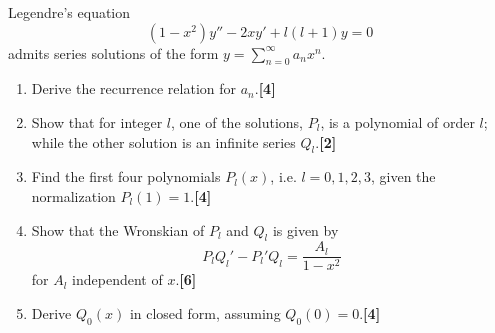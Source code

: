 \documentclass[a4paper]{article}
\begin{document}
\newpage
\begin{qns}
Legendre's equation
$$(1-x^2)y''-2xy'+l(l+1)y=0$$
admits series solutions of the form $y=\sum_{n=0}^\infty a_nx^n$.
\begin{enumerate}[label=(\alph*)]
\item Derive the recurrence relation for $a_n$.\hfill \textbf{[4]}
\item Show that for integer $l$, one of the solutions, $P_l$, is  a polynomial of order $l$; while the other solution is an infinite series $Q_l$.\hfill \textbf{[2]}
\item Find the first four polynomials $P_l(x)$, i.e. $l=0,1,2,3$, given the normalization $P_l(1)=1$.\hfill \textbf{[4]}
\item Show that the Wronskian of $P_l$ and $Q_l$ is given by
$$P_lQ_l'-P_l'Q_l=\frac{A_l}{1-x^2}$$
for $A_l$ independent of $x$.\hfill \textbf{[6]}
\item Derive $Q_0(x)$ in closed form, assuming $Q_0(0)=0$.\hfill \textbf{[4]}
\end{enumerate}
\end{qns}
\end{document}
